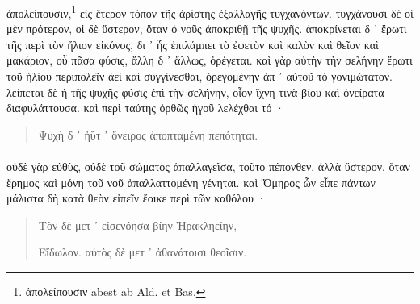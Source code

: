 \documentclass[a4paper, 11pt, oneside, polutonikogreek, german]{article}
\begin{document}
ἀπολείπουσιν,\footnote{ἀπολείπουσιν abest ab Ald. et Bas.} εἰς ἕτερον τόπον τῆς ἀρίστης ἐξαλλαγῆς τυγχανόντων. τυγχάνουσι δὲ οἱ μὲν πρότερον, οἱ δὲ ὕστερον, ὅταν ὁ νοῦς ἀποκριθῇ τῆς ψυχῆς. ἀποκρίνεται δ ᾽ ἔρωτι τῆς περὶ τὸν ἥλιον εἰκόνος, δι ᾽ ἧς ἐπιλάμπει τὸ ἐφετὸν καὶ καλὸν καὶ θεῖον καὶ μακάριον, οὗ πᾶσα φύσις, ἄλλη δ ᾽ ἄλλως, ὀρέγεται. καὶ γὰρ αὐτὴν τὴν σελήνην ἔρωτι τοῦ ἡλίου περιπολεῖν ἀεὶ καὶ συγγίνεσθαι, ὀρεγομένην ἀπ ᾽ αὐτοῦ τὸ γονιμώτατον. λείπεται δὲ ἡ τῆς ψυχῆς φύσις ἐπὶ τὴν σελήνην, οἷον ἴχνη τινὰ βίου καὶ ὀνείρατα διαφυλάττουσα. καὶ περὶ ταύτης ὀρθῶς ἡγοῦ λελέχθαι τό ·
\begin{quotation}
Ψυχὴ δ ᾽ ἠΰτ ᾽ ὄνειρος ἀποπταμένη πεπότηται.
\end{quotation}
\paragraph{}
οὐδὲ γὰρ εὐθὺς, οὐδὲ τοῦ σώματος ἀπαλλαγεῖσα, τοῦτο πέπονθεν, ἀλλὰ ὕστερον, ὅταν ἔρημος καὶ μόνη τοῦ νοῦ ἀπαλλαττομένη γένηται. καὶ Ὅμηρος ὧν εἶπε πάντων μάλιστα δὴ κατὰ θεὸν εἰπεῖν ἔοικε περὶ τῶν καθόλου ·
\begin{quotation}
Τὸν δὲ μετ ᾽ εἰσενόησα βίην Ἡρακληείην,

Εἴδωλον. αὐτὸς δὲ μετ ᾽ ἀθανάτοισι θεοῖσιν.
\end{quotation}
\end{document}

